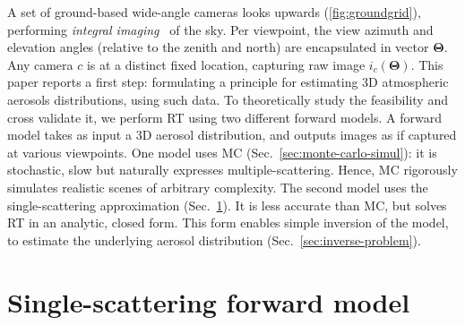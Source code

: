 \documentclass[10pt,letterpaper]{article}
\begin{document}
A set of ground-based wide-angle cameras looks upwards
(\cref{fig:groundgrid}), performing {\em integral
  imaging}~\cite{Hong2004} of the sky. Per viewpoint, the view azimuth
and elevation angles (relative to the zenith and north) are
encapsulated in vector ${\bm{\Theta}}$. Any camera $c$ is at a
distinct fixed location, capturing raw image
$i_c({\bm{\Theta}})$. This paper reports a first step: formulating a
principle for estimating 3D atmospheric aerosols distributions, using
such data. To theoretically study the feasibility and cross validate
it, we perform RT using two different forward models. A forward model
takes as input a 3D aerosol distribution, and outputs images as if
captured at various viewpoints.  One model uses MC
(Sec.~\ref{sec:monte-carlo-simul}): it is stochastic, slow but
naturally expresses multiple-scattering. Hence, MC rigorously
simulates realistic scenes of arbitrary complexity.
The second model uses the single-scattering approximation
(Sec.~\ref{sec:single-scatt-model}). It is less accurate than MC, but
solves RT in an analytic, closed form. This form enables simple
inversion of the model, to estimate the underlying aerosol
distribution (Sec.~\ref{sec:inverse-problem}).


\section{Single-scattering forward model}
\label{sec:single-scatt-model}
\end{document}
